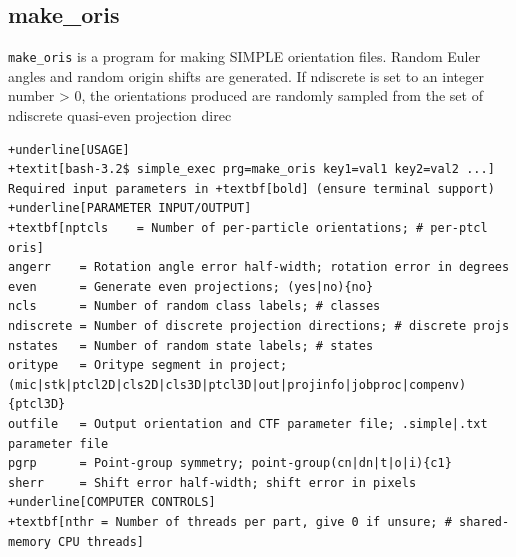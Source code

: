 \documentclass[a4paper,11pt]{article}
\newcommand{\prgname}[1]{\textcolor{NavyBlue}{\texttt{#1}}}
\begin{document}
\subsection{make\_oris}
\label{make_oris}
\prgname{make\_oris} is a program for making SIMPLE orientation files. Random Euler angles and random origin shifts are generated. If ndiscrete is set to an integer number > 0, the orientations produced are randomly sampled from the set of ndiscrete quasi-even projection direc
\begin{Verbatim}[commandchars=+\[\],fontsize=\small,breaklines=true]
+underline[USAGE]
+textit[bash-3.2$ simple_exec prg=make_oris key1=val1 key2=val2 ...]
Required input parameters in +textbf[bold] (ensure terminal support)
+underline[PARAMETER INPUT/OUTPUT]
+textbf[nptcls    = Number of per-particle orientations; # per-ptcl oris]
angerr    = Rotation angle error half-width; rotation error in degrees
even      = Generate even projections; (yes|no){no}
ncls      = Number of random class labels; # classes
ndiscrete = Number of discrete projection directions; # discrete projs
nstates   = Number of random state labels; # states
oritype   = Oritype segment in project; (mic|stk|ptcl2D|cls2D|cls3D|ptcl3D|out|projinfo|jobproc|compenv){ptcl3D}
outfile   = Output orientation and CTF parameter file; .simple|.txt parameter file
pgrp      = Point-group symmetry; point-group(cn|dn|t|o|i){c1}
sherr     = Shift error half-width; shift error in pixels
+underline[COMPUTER CONTROLS]
+textbf[nthr = Number of threads per part, give 0 if unsure; # shared-memory CPU threads]
\end{Verbatim}
\end{document}

